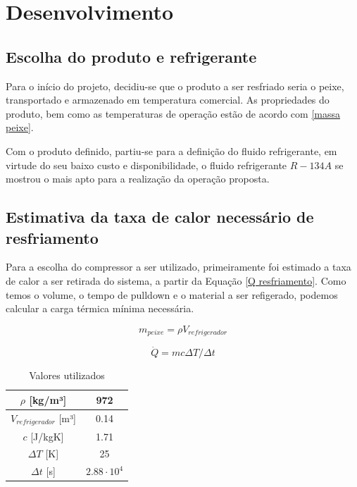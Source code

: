 \chapter{Desenvolvimento}

\section{Escolha do produto e refrigerante}

    Para o início do projeto, decidiu-se que o produto a ser resfriado seria o peixe, transportado e armazenado em temperatura comercial. As propriedades do produto, bem como as temperaturas de operação estão de acordo com \ref{massa peixe}. 

    Com o produto definido, partiu-se para a definição do fluido refrigerante, em virtude do seu baixo custo e disponibilidade, o fluido refrigerante $R-134A$ se mostrou o mais apto para a realização da operação proposta.

\section{Estimativa da taxa de calor necessário de resfriamento}

    Para a escolha do compressor a ser utilizado, primeiramente foi estimado a taxa de calor a ser retirada do sistema, a partir da Equação \ref{Q resfriamento}. Como temos o volume, o tempo de pulldown e o material a ser refigerado, podemos calcular a carga térmica mínima necessária.

\begin{equation}
    m_{peixe} = \rho V_{refrigerador}
    \label{massa peixe}
\end{equation}

\begin{equation}
    \dot{Q} = m c \Delta T / \Delta t
    \label{Q resfriamento}
\end{equation}


\begin{table}[h]
\centering
\begin{tabular}{|c|c|}
\hline
$\rho$ {[}kg/m³{]} & 972 \\ \hline
$V_{refrigerador}$ {[}m³{]}     & 0.14 \\ \hline
$c$ {[}J/kgK{]}     &  1.71 \\ \hline
$\Delta T$ {[}K{]}     &  25 \\ \hline
$\Delta t$ {[}s{]}     &  $2.88 \cdot10^{4}$ \\ \hline
\end{tabular}
\caption{Valores utilizados}
\label{tab:tabela dados}
\end{table}


